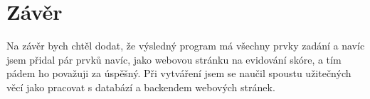 \section{Závěr}
Na závěr bych chtěl dodat, že výsledný program má všechny prvky zadání a navíc jsem přidal pár prvků navíc, jako webovou stránku na evidování skóre, a tím pádem ho považuji za úspěšný. Při vytváření jsem se naučil spoustu užitečných věcí jako pracovat s databází a backendem webových stránek.